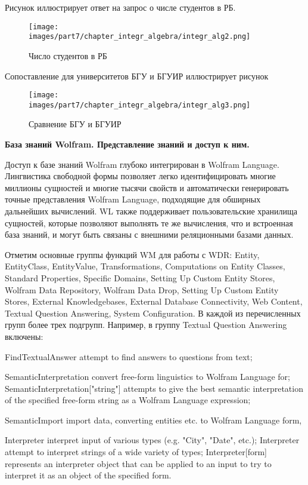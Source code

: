 Рисунок \textit{} иллюстрирует ответ на запрос о числе студентов в РБ. 
\begin{figure}[h]
	\centering
	\texttt{[image: images/part7/chapter\_integr\_algebra/integr\_alg2.png]}
	\caption{Число студентов в РБ}
	\label{fig:integr_alg2}
\end{figure}

Сопоставление для университетов БГУ и БГУИР иллюстрирует рисунок \textit{}
\begin{figure}[h]
	\centering
	\texttt{[image: images/part7/chapter\_integr\_algebra/integr\_alg3.png]}
	\caption{Сравнение БГУ и БГУИР}
	\label{fig:integr_alg3}
\end{figure}

\textbf{База знаний Wolfram. Представление знаний и доступ к ним.}

Доступ к базе знаний Wolfram глубоко интегрирован в Wolfram Language. Лингвистика свободной формы позволяет легко идентифицировать многие миллионы сущностей и многие тысячи свойств и автоматически генерировать точные представления Wolfram Language, подходящие для обширных дальнейших вычислений. WL также поддерживает пользовательские хранилища сущностей, которые позволяют выполнять те же вычисления, что и встроенная база знаний, и могут быть связаны с внешними реляционными базами данных. 

Отметим основные группы функций WM для работы с WDR: 
Entity, EntityClass, EntityValue, Transformations, Computations on Entity Classes, Standard Properties, Specific Domains, Setting Up Custom Entity Stores, Wolfram Data Repository, Wolfram Data Drop, Setting Up Custom Entity Stores, External Knowledgebases, External Database Connectivity, Web Content, Textual Question Answering, System Configuration. 
В каждой из перечисленных групп более трех подгрупп. Например, в группу Textual Question Answering включены: 
\begin{textitemize}
	\item FindTextualAnswer attempt to find answers to questions from text;
	\item SemanticInterpretation convert free-form linguistics to Wolfram Language for; SemanticInterpretation["string"] attempts to give the best semantic interpretation of the specified free-form string as a Wolfram Language expression; 
	\item SemanticImport import data, converting entities etc. to Wolfram Language form, 
	\item Interpreter interpret input of various types (e.g. "City", "Date", etc.); Interpreter attempt to interpret strings of a wide variety of types; Interpreter[form] represents an interpreter object that can be applied to an input to try to interpret it as an object of the specified form.
\end{textitemize}


